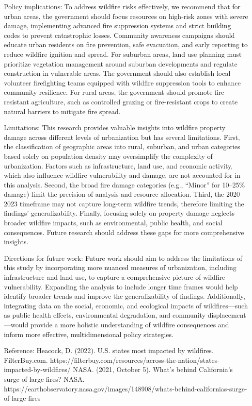 \documentclass[
  letterpaper,
  DIV=11,
  numbers=noendperiod]{scrartcl}
\begin{document}
Policy implications: To address wildfire risks effectively, we recommend
that for urban areas, the government should focus resources on high-risk
zones with severe damage, implementing advanced fire suppression systems
and strict building codes to prevent catastrophic losses. Community
awareness campaigns should educate urban residents on fire prevention,
safe evacuation, and early reporting to reduce wildfire ignition and
spread. For suburban areas, land use planning must prioritize vegetation
management around suburban developments and regulate construction in
vulnerable areas. The government should also establish local volunteer
firefighting teams equipped with wildfire suppression tools to enhance
community resilience. For rural areas, the government should promote
fire-resistant agriculture, such as controlled grazing or fire-resistant
crops to create natural barriers to mitigate fire spread.

Limitations: This research provides valuable insights into wildfire
property damage across different levels of urbanization but has several
limitations. First, the classification of geographic areas into rural,
suburban, and urban categories based solely on population density may
oversimplify the complexity of urbanization. Factors such as
infrastructure, land use, and economic activity, which also influence
wildfire vulnerability and damage, are not accounted for in this
analysis. Second, the broad fire damage categories (e.g., ``Minor'' for
10--25\% damage) limit the precision of analysis and resource
allocation. Third, the 2020--2023 timeframe may not capture long-term
wildfire trends, therefore limiting the findings' generalizability.
Finally, focusing solely on property damage neglects broader wildfire
impacts, such as environmental, public health, and social consequences.
Future research should address these gaps for more comprehensive
insights.

Directions for future work: Future work should aim to address the
limitations of this study by incorporating more nuanced measures of
urbanization, including infrastructure and land use, to capture a
comprehensive picture of wildfire vulnerability. Expanding the analysis
to include longer time frames would help identify broader trends and
improve the generalizability of findings. Additionally, integrating data
on the social, economic, and ecological impacts of wildfires---such as
public health effects, environmental degradation, and community
displacement---would provide a more holistic understanding of wildfire
consequences and inform more effective, multidimensional policy
strategies.

Reference: Heacock, D. (2022). U.S. states most impacted by wildfires.
FilterBuy.com.
https://filterbuy.com/resources/across-the-nation/states-impacted-by-wildfires/
NASA. (2021, October 5). What's behind California's surge of large
fires? NASA.
https://earthobservatory.nasa.gov/images/148908/whats-behind-californias-surge-of-large-fires
\end{document}
